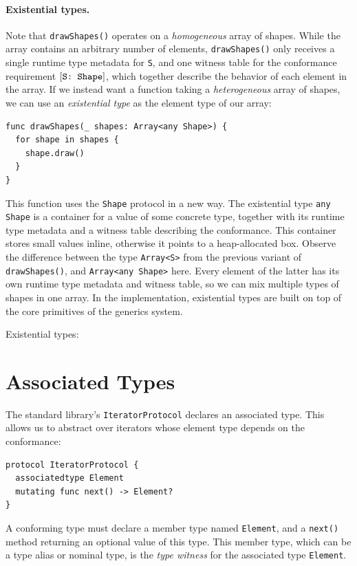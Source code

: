 \documentclass[../generics]{subfiles}
\begin{document}
\paragraph{Existential types.}
Note that \verb|drawShapes()| operates on a \emph{homogeneous} array of shapes. While the array contains an arbitrary number of elements, \verb|drawShapes()| only receives a single runtime type metadata for \texttt{S}, and one witness table for the conformance requirement $[\texttt{S:~Shape}]$, which together describe the behavior of each element in the array. If we instead want a function taking a \emph{heterogeneous} array of shapes, we can use an \emph{existential type} as the element type of our array:
\begin{Verbatim}
func drawShapes(_ shapes: Array<any Shape>) {
  for shape in shapes {
    shape.draw()
  }
}
\end{Verbatim}
This function uses the \texttt{Shape} protocol in a new way. The existential type \texttt{any Shape} is a container for a value of some concrete type, together with its runtime type metadata and a witness table describing the conformance. This container stores small values inline, otherwise it points to a heap-allocated box. Observe the difference between the type \texttt{Array<S>} from the previous variant of \verb|drawShapes()|, and \texttt{Array<any Shape>} here. Every element of the latter has its own runtime type metadata and witness table, so we can mix multiple types of shapes in one array. In the implementation, existential types are built on top of the core primitives of the generics system.

\begin{MoreDetails}
\item Existential types: 
\end{MoreDetails}

\section{Associated Types}

The standard library's \texttt{IteratorProtocol} declares an associated type. This allows us to abstract over iterators whose element type depends on the conformance:
\begin{Verbatim}
protocol IteratorProtocol {
  associatedtype Element
  mutating func next() -> Element?
}
\end{Verbatim}
A conforming type must declare a member type named \texttt{Element}, and a \texttt{next()} method returning an optional value of this type. This member type, which can be a type alias or nominal type, is the \emph{type witness} for the associated type \texttt{Element}.
\end{document}
